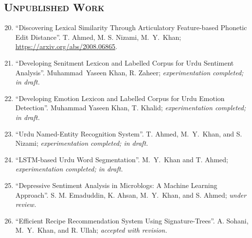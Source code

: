 \documentclass[a4paper, 10pt]{article}
\begin{document}
\subsection*{\normalfont\textsc{ Unpublished Work}}
\begin{enumerate}
\setcounter{enumi}{19}
\itemsep-4pt 

	\item ``Discovering Lexical Similarity Through Articulatory Feature-based Phonetic Edit Distance''. T. Ahmed, M. S. Nizami, \textcolor{NavyBlue}{M.~Y.~Khan}; \textcolor{blue}{\url{https://arxiv.org/abs/2008.06865}}.
	
	\item ``Developing Senitment Lexicon and Labelled Corpus for Urdu Sentiment Analysis''. \textcolor{NavyBlue}{Muhammad~Yaseen Khan}, R. Zaheer; \emph{\small experimentation completed; in draft.}
	
	\item ``Developing Emotion Lexicon and Labelled Corpus for Urdu Emotion Detection''. \textcolor{NavyBlue}{Muhammad Yaseen Khan}, T. Khalid; \emph{\small experimentation completed; in draft.}	

	\item ``Urdu Named-Entity Recognition System''. T. Ahmed, \textcolor{NavyBlue}{M.~Y.~Khan}, and S. Nizami; \emph{\small experimentation completed; in draft.}
	
	\item ``LSTM-based Urdu Word Segmentation''. \textcolor{NavyBlue}{M.~Y.~Khan} and T. Ahmed; \emph{\small experimentation completed; in draft.}
	
	\item ``Depressive Sentiment Analysis in Microblogs: A Machine Learning Approach''. S. M. Emaduddin, K. Ahsan, \textcolor{NavyBlue}{M.~Y.~Khan}, and S. Ahmed; \emph{\small under review.}
	
	\item ``Efficient Recipe Recommendation System Using Signature-Trees''. A. Sohani, \textcolor{NavyBlue}{M.~Y.~Khan}, and R. Ullah; 
	\emph{\small accepted with revision.}
	
	


\end{enumerate}
\end{document}
